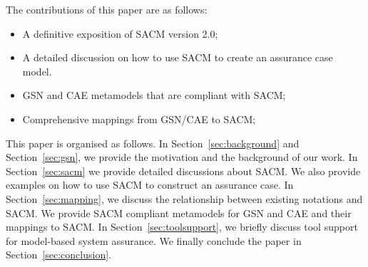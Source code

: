 The contributions of this paper are as follows:
\begin{itemize}
	\item A definitive exposition of SACM version 2.0;
	\item A detailed discussion on how to use SACM to create an assurance case model.
	\item GSN and CAE metamodels that are compliant with SACM;
	\item Comprehensive mappings from GSN/CAE to SACM;
\end{itemize}

This paper is organised as follows. 
In Section~\ref{sec:background} and Section~\ref{sec:gsn}, we provide the motivation and the background of our work. 
In Section~\ref{sec:sacm} we provide detailed discussions about SACM. 
We also provide examples on how to use SACM to construct an assurance case. 
In Section~\ref{sec:mapping}, we discuss the relationship between existing notations and SACM. 
We provide SACM compliant metamodels for GSN and CAE and their mappings to SACM. 
In Section~\ref{sec:toolsupport}, we briefly discuss tool support for model-based system assurance. 
We finally conclude the paper in Section~\ref{sec:conclusion}.


